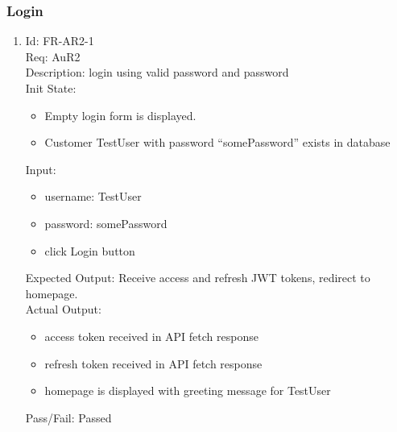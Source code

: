 \documentclass[12pt, titlepage]{article}
\begin{document}
\subsubsection{Login}
\begin{enumerate}
    \item Id: FR-AR2-1\\
    Req: AuR2\\
    Description: login using valid password and password\\
    Init State: \begin{itemize}[noitemsep,topsep=0pt]
        \item Empty login form is displayed.
        \item Customer TestUser with password ``somePassword'' exists in database
    \end{itemize}
    Input: \begin{itemize}[noitemsep,topsep=0pt]
        \item username: TestUser
        \item password: somePassword
        \item click Login button
    \end{itemize}
    Expected Output: Receive access and refresh JWT tokens, redirect to homepage.\\ 
    Actual Output: \begin{itemize}[noitemsep,topsep=0pt]
        \item access token received in API fetch response
        \item refresh token received in API fetch response
        \item homepage is displayed with greeting message for TestUser
    \end{itemize}
    Pass/Fail: Passed


\end{enumerate}
\end{document}

